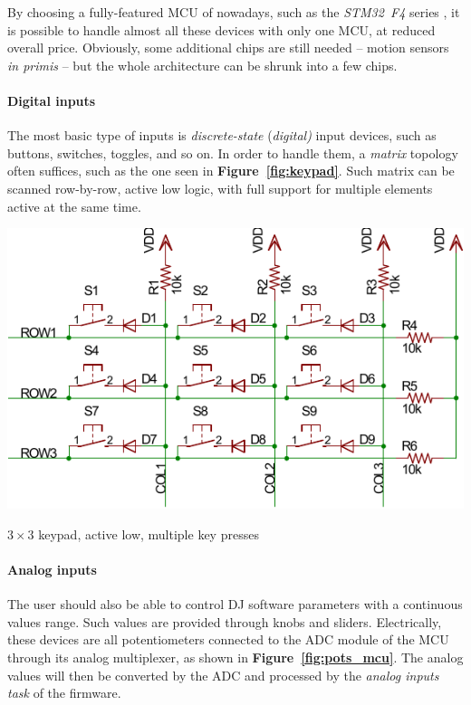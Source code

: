 \documentclass[a4paper,10pt]{article}
\makeatletter
\newenvironment{figurehere}{\def\@captype{figure}\vspace{2ex}}{\vspace{2ex}}
\newcommand{\citef}[1]{\textbf{Figure~\ref{#1}}}
\makeatother
\begin{document}
\begin{multicols}{2}
By choosing a fully-featured MCU of nowadays, such as the \emph{STM32~F4}
series \cite{st_stm32f4}, it is possible to handle almost all these devices
with only one MCU, at reduced overall price. Obviously, some additional chips
are still needed -- motion sensors \emph{in primis} -- but the whole
architecture can be shrunk into a few chips.


\paragraph{Digital inputs}
The most basic type of inputs is \emph{discrete-state} (\emph{digital)} input
devices, such as buttons, switches, toggles, and so on. In order to handle
them, a \emph{matrix} topology often suffices, such as the one seen in
\citef{fig:keypad}. Such matrix can be scanned row-by-row, active low logic,
with full support for multiple elements active at the same time.

\begin{figurehere}
	\centering
	\includegraphics[keepaspectratio=true,width=0.8\columnwidth]{images/keypad.pdf}
	\caption{$ 3 \times 3 $ keypad, active low, multiple key presses}
	\label{fig:keypad}
\end{figurehere}


\paragraph{Analog inputs}
The user should also be able to control DJ software parameters with a 
continuous values range. Such values are provided through knobs and sliders.
Electrically, these devices are all potentiometers connected to the ADC module
of the MCU through its analog multiplexer, as shown in \citef{fig:pots_mcu}.
The analog values will then be converted by the ADC and processed by the
\emph{analog inputs task} of the firmware.


\end{multicols}
\end{document}
